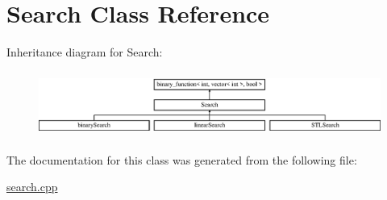 \hypertarget{class_search}{}\section{Search Class Reference}
\label{class_search}
Inheritance diagram for Search\+:\begin{figure}[H]
\begin{center}
\leavevmode
\includegraphics[height=2.153846cm]{class_search}
\end{center}
\end{figure}


The documentation for this class was generated from the following file\+:\begin{DoxyCompactItemize}
\item 
\hyperlink{search_8cpp}{search.\+cpp}\end{DoxyCompactItemize}
